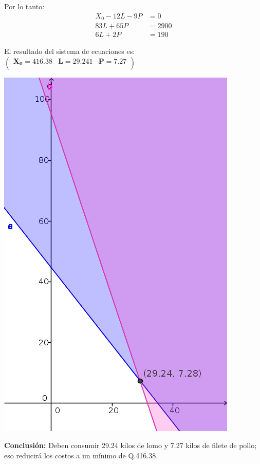 \documentclass[11pt]{article}
\newcommand\conclusion{\vspace{.10in}\textbf{Conclusión: }}
\begin{document}
Por lo tanto:
\begin{align*}
X_0 - 12L - 9P &= 0\\
83L + 65P &= 2900\\
6L + 2P &= 190
\end{align*}

El resultado del sistema de ecuaciones es:
\begin{math}
\mathbf{\left(\begin{array}{rrr}X_0=416.38&L=29.241&P=7.27\\
\end{array}\right)}
\end{math}

\begin{center}
\includegraphics[scale=0.4]{parcial1src/problema17.png}
\end{center}

\conclusion Deben consumir 29.24 kilos de lomo y 7.27 kilos de filete de pollo; eso reducirá los costos a un mínimo de Q.416.38.
\end{document}
